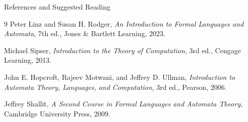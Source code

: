 \documentclass[10pt]{beamer}
\begin{document}
\begin{frame}{References and Suggested Reading}
  \footnotesize
  \begin{thebibliography}{9}
      Peter Linz and Susan H. Rodger,
      \newblock \emph{An Introduction to Formal Languages and Automata}, 7th ed.,
      \newblock Jones \& Bartlett Learning, 2023.

      Michael Sipser,
      \newblock \emph{Introduction to the Theory of Computation}, 3rd ed.,
      \newblock Cengage Learning, 2013.

      John E. Hopcroft, Rajeev Motwani, and Jeffrey D. Ullman,
      \newblock \emph{Introduction to Automata Theory, Languages, and
      Computation}, 3rd ed.,
      \newblock Pearson, 2006.

      Jeffrey Shallit,
      \newblock \emph{A Second Course in Formal Languages and Automata
      Theory},
      \newblock Cambridge University Press, 2009.
  \end{thebibliography}
\end{frame}
\end{document}
